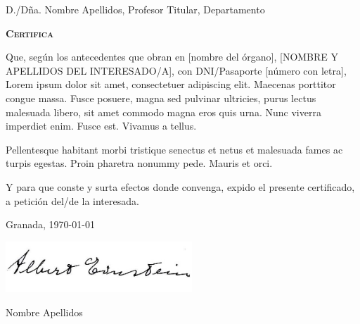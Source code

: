 \documentclass{UGR-generico}
\newcommand{\miNombre}{Nombre Apellidos\xspace}
\newcommand{\miCargo}{Profesor Titular\xspace}
\newcommand{\miDepartamento}{Departamento}
\begin{document}
\thispagestyle{scrheadings}

\hfill\vfill
\begin{bfseries}
D./Dña. \miNombre, \miCargo, \miDepartamento 
\end{bfseries}
\bigskip

\begin{center}
  \bfseries\scshape
  Certifica
\end{center}
\bigskip

Que, según los antecedentes que obran en [nombre del órgano], [NOMBRE Y APELLIDOS DEL INTERESADO/A], con DNI/Pasaporte [número con letra], Lorem ipsum dolor sit amet, consectetuer adipiscing elit. Maecenas porttitor congue massa. Fusce posuere, magna sed pulvinar ultricies, purus lectus malesuada libero, sit amet commodo magna eros quis urna.
Nunc viverra imperdiet enim. Fusce est. Vivamus a tellus.

Pellentesque habitant morbi tristique senectus et netus et malesuada fames ac turpis egestas. Proin pharetra nonummy pede. Mauris et orci.

Y para que conste y surta efectos donde convenga, expido el presente certificado, a petición del/de la interesada. 

\vfill\vfill
\begin{center}
  Granada, \today

  \includegraphics[width=7cm]{img/firma}

  \miNombre
\end{center}
\vfill



%
\end{document}
